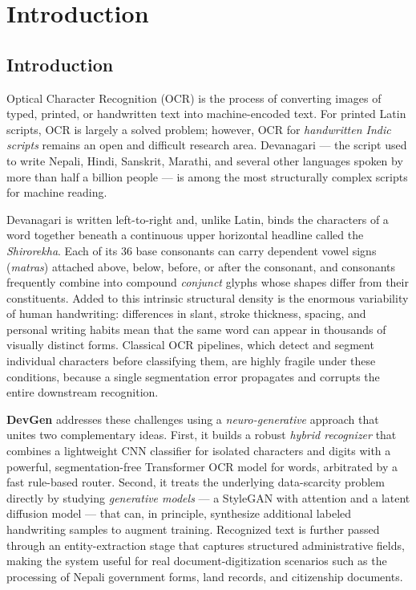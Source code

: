 \documentclass[12pt,a4paper]{report}
\begin{document}
\chapter{Introduction}

\section{Introduction}
Optical Character Recognition (OCR) is the process of converting images of typed, printed, or handwritten text into machine-encoded text. For printed Latin scripts, OCR is largely a solved problem; however, OCR for \textit{handwritten Indic scripts} remains an open and difficult research area. Devanagari --- the script used to write Nepali, Hindi, Sanskrit, Marathi, and several other languages spoken by more than half a billion people --- is among the most structurally complex scripts for machine reading.

Devanagari is written left-to-right and, unlike Latin, binds the characters of a word together beneath a continuous upper horizontal headline called the \textit{Shirorekha}. Each of its 36 base consonants can carry dependent vowel signs (\textit{matras}) attached above, below, before, or after the consonant, and consonants frequently combine into compound \textit{conjunct} glyphs whose shapes differ from their constituents. Added to this intrinsic structural density is the enormous variability of human handwriting: differences in slant, stroke thickness, spacing, and personal writing habits mean that the same word can appear in thousands of visually distinct forms. Classical OCR pipelines, which detect and segment individual characters before classifying them, are highly fragile under these conditions, because a single segmentation error propagates and corrupts the entire downstream recognition.

\textbf{DevGen} addresses these challenges using a \textit{neuro-generative} approach that unites two complementary ideas. First, it builds a robust \textit{hybrid recognizer} that combines a lightweight CNN classifier for isolated characters and digits with a powerful, segmentation-free Transformer OCR model for words, arbitrated by a fast rule-based router. Second, it treats the underlying data-scarcity problem directly by studying \textit{generative models} --- a StyleGAN with attention and a latent diffusion model --- that can, in principle, synthesize additional labeled handwriting samples to augment training. Recognized text is further passed through an entity-extraction stage that captures structured administrative fields, making the system useful for real document-digitization scenarios such as the processing of Nepali government forms, land records, and citizenship documents.
\end{document}
